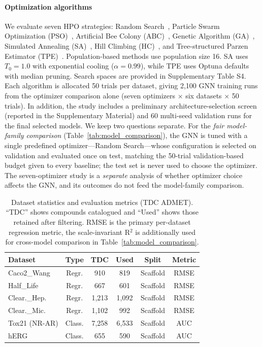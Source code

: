 \documentclass[journal]{IEEEtran}
\begin{document}
\paragraph{Optimization algorithms}
We evaluate seven HPO strategies: Random Search~\cite{bergstra2012random}, Particle Swarm Optimization (PSO)~\cite{kennedy1995pso}, Artificial Bee Colony (ABC)~\cite{karaboga2005abc}, Genetic Algorithm (GA)~\cite{holland1975ga}, Simulated Annealing (SA)~\cite{saopt}, Hill Climbing (HC)~\cite{russell2010aima}, and Tree-structured Parzen Estimator (TPE)~\cite{akiba2019optuna}. Population-based methods use population size 16. SA uses $T_0=1.0$ with exponential cooling ($\alpha=0.99$), while TPE uses Optuna defaults with median pruning. Search spaces are provided in Supplementary Table S4. Each algorithm is allocated 50 trials per dataset, giving 2{,}100 GNN training runs from the optimizer comparison alone (seven optimizers $\times$ six datasets $\times$ 50 trials). In addition, the study includes a preliminary architecture-selection screen (reported in the Supplementary Material) and 60 multi-seed validation runs for the final selected models. We keep two questions separate. For the \emph{fair model-family comparison} (Table~\ref{tab:model_comparison}), the GNN is tuned with a single predefined optimizer---Random Search---whose configuration is selected on validation and evaluated once on test, matching the 50-trial validation-based budget given to every baseline; the test set is never used to choose the optimizer. The seven-optimizer study is a \emph{separate} analysis of whether optimizer choice affects the GNN, and its outcomes do not feed the model-family comparison.

\begin{table}[!t]
\centering
\caption{Dataset statistics and evaluation metrics (TDC ADMET). ``TDC'' shows compounds catalogued and ``Used'' shows those retained after filtering. RMSE is the primary per-dataset regression metric, the scale-invariant R$^2$ is additionally used for cross-model comparison in Table~\ref{tab:model_comparison}.}
\label{tab:dataset_stats}
\small
\begin{tabular}{lccccc}
\toprule
\textbf{Dataset} & \textbf{Type} & \textbf{TDC} & \textbf{Used} & \textbf{Split} & \textbf{Metric} \\
\midrule
Caco2\_Wang & Regr. & 910 & 819 & Scaffold & RMSE \\
Half\_Life & Regr. & 667 & 601 & Scaffold & RMSE \\
Clear.\_Hep. & Regr. & 1,213 & 1,092 & Scaffold & RMSE \\
Clear.\_Mic. & Regr. & 1,102 & 992 & Scaffold & RMSE \\
Tox21 (NR-AR) & Class. & 7,258 & 6,533 & Scaffold & AUC \\
hERG & Class. & 655 & 590 & Scaffold & AUC \\
\bottomrule
\end{tabular}
\end{table}
\end{document}
